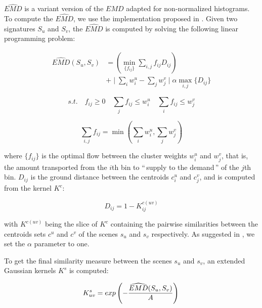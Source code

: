 \documentclass[journal]{IEEEtran}
\begin{document}
$\widehat{EMD}$ is a variant version of the $EMD$ adapted for non-normalized histograms. To compute the $\widehat{EMD}$, we use the implementation proposed in \cite{pele2009fast}. Given two signatures $S_u$ and $S_v$, the $\widehat{EMD}$ is computed by solving the following linear programming problem:

\begin{equation}
\begin{split}
\widehat{EMD}(S_u,S_v) &=( \min\limits_{\lbrace f_{ij}\rbrace} \sum\limits_{i,j} f_{ij}D_{ij} )  \\ 
&+ \mid \sum\limits_{i} w_i^u - \sum\limits_{j} w_j^v  \mid \alpha \max\limits_{i,j}\lbrace  D_{ij}\rbrace
\end{split}
\end{equation}

\begin{equation*}
s.t. \quad f_{ij}\geq0 \quad \sum\limits_{j} f_{ij} \leq w_i^u \quad \sum\limits_{i} f_{ij} \leq w_j^v 
\end{equation*}

\begin{equation*}
\sum\limits_{i,j}f_{ij} = \min( \sum\limits_{i} w_i^u ,\sum\limits_{j} w_j^v )
\end{equation*}

where $\lbrace f_{ij} \rbrace$ is the optimal flow between the cluster weights $w_i^u$ and $w_j^v$, that is, the amount transported from the $i$th bin to ``\,supply to the demand\,'' of the $j$th bin. $D_{ij}$ is the ground distance between the centroids $c_i^u$ and $c_j^v$, and is computed from the kernel $K^c$:

\begin{equation*}
D_{ij}=1-K^{c(uv)}_{ij}
\end{equation*}

with $K^{c(uv)}$ being the slice of $K^{c}$ containing the pairwise similarities between the centroids sets $c^u$ and $c^v$ of the scenes $s_u$ and $s_v$ respectively. As suggested in \cite{pele2009fast}, we set the $\alpha$ parameter to one.

To get the final similarity measure between the scenes $s_u$ and $s_v$, an extended Gaussian kernels $K^s$ \cite{chapelle1999support,jing2003support} is computed:

\begin{equation}
\label{eq:ks}
K_{uv}^s = exp\left( - \dfrac{\widehat{EMD}(S_u,S_v)}{A} \right) \\
\end{equation}
\end{document}
